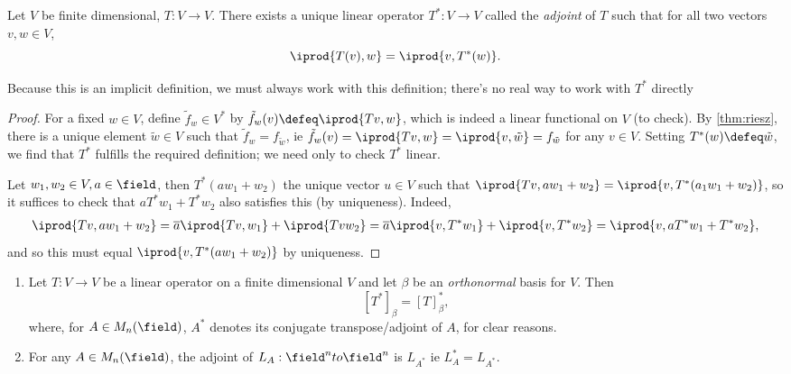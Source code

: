 \begin{theorem}[Adjoint]
    Let $V$ be finite dimensional, $T : V \to V$. There exists a unique linear operator $T^\ast : V \to V$ called the \emph{adjoint} of $T$ such that for all two vectors $v, w \in V$, \[
    \iprod{T(v), w} = \iprod{v, T^\ast(w)}.
    \]
\end{theorem}

\begin{remark}
    Because this is an implicit definition, we must always work with this definition; there's no real way to work with $T^\ast$ directly
\end{remark}

\begin{proof}
    For a fixed $w \in V$, define $\tilde{f}_w \in V^\ast$ by $\tilde{f}_w(v) \defeq \iprod{Tv, w}$, which is indeed a linear functional on $V$ (to check). By \cref{thm:riesz}, there is a unique element $\tilde{w} \in V$ such that $\tilde{f}_w = f_{\tilde{w}}$, ie $\tilde{f}_w(v) = \iprod{Tv, w} = \iprod{v, \tilde{w}} = f_{\tilde{w}}$ for any $v \in V$. Setting $T^\ast(w) \defeq \tilde{w}$, we find that $T^\ast$ fulfills the required definition; we need only to check $T^\ast$ linear.

    Let $w_1, w_2 \in V, a \in \field$, then $T^\ast(aw_1 + w_2)$ the unique vector $u \in V$ such that $\iprod{Tv, aw_1 + w_2} = \iprod{v, T^\ast(a_1 w_1 + w_2)}$, so it suffices to check that $aT^\ast w_1 + T^\ast w_2$ also satisfies this (by uniqueness). Indeed, \begin{align*}
        \iprod{Tv, aw_1 + w_2} = \overline{a} \iprod{Tv, w_1} + \iprod{Tv w_2} = \overline{a} \iprod{v, T^\ast w_1} + \iprod{v, T^\ast w_2} = \iprod{v, aT^\ast w_1 + T^\ast w_2},
    \end{align*}
    and so this must equal $\iprod{v, T^\ast (aw_1 + w_2)}$ by uniqueness.
\end{proof}

\begin{proposition}
    \begin{enumerate}[label=(\alph*)]
        \item Let $T : V \to V$ be a linear operator on a finite dimensional $V$ and let $\beta$ be an \emph{orthonormal} basis for $V$. Then \[
        [T^\ast]_\beta = [T]_\beta^\ast,    
        \]
        where, for $A \in M_n(\field)$, $A^\ast$ denotes its conjugate transpose/adjoint of $A$, for clear reasons.
    \item For any $A \in M_n(\field)$, the adjoint of $L_A : \field^n to \field^n$ is $L_{A^\ast}$ ie $L_A^\ast = L_{A^\ast}$.
    \end{enumerate}
\end{proposition}

